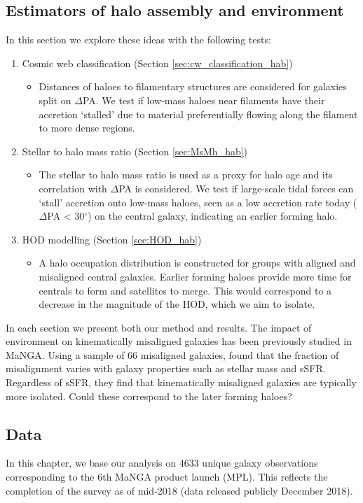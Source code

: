 \subsection{Estimators of halo assembly and environment}
In this section we explore these ideas with the following tests:
\begin{enumerate}
\item Cosmic web classification (Section \ref{sec:cw_classification_hab})
\begin{itemize}
\item Distances of haloes to filamentary structures are considered for galaxies split on $\Delta$PA. We test if low-mass haloes near filaments have their accretion `stalled' due to material preferentially flowing along the filament to more dense regions. 
\end{itemize}
\item Stellar to halo mass ratio  (Section \ref{sec:MsMh_hab})
\begin{itemize}
\item The stellar to halo mass ratio is used as a proxy for halo age and its correlation with $\Delta$PA is considered. We test if large-scale tidal forces can `stall' accretion onto low-mass haloes, seen as a low accretion rate today ($\Delta$PA < 30$^{\circ}$) on the central galaxy, indicating an earlier forming halo.
\end{itemize}
\item HOD modelling (Section \ref{sec:HOD_hab})
\begin{itemize}
\item A halo occupation distribution is constructed for groups with aligned and misaligned central galaxies. Earlier forming haloes provide more time for centrals to form and satellites to merge. This would correspond to a decrease in the magnitude of the HOD, which we aim to isolate. 
\end{itemize}
\end{enumerate}
In each section we present both our method and results. The impact of environment on kinematically misaligned galaxies has been previously studied in MaNGA. Using a sample of 66 misaligned galaxies, \citet{jin2016} found that the fraction of misalignment varies with galaxy properties such as stellar mass and sSFR. Regardless of sSFR, they find that kinematically misaligned galaxies are typically more isolated. Could these correspond to the later forming haloes?

\subsection{Data}
In this chapter, we base our analysis on 4633 unique galaxy observations corresponding to the 6th MaNGA product launch (MPL). This reflects the completion of the survey as of mid-2018 (data released publicly December 2018). 

